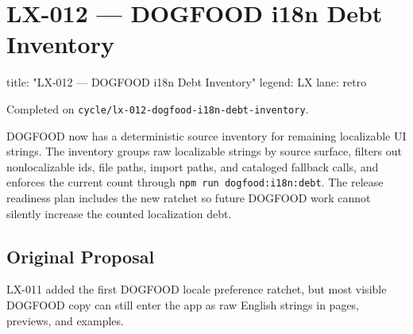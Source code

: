 \chapter{LX-012 --- DOGFOOD i18n Debt Inventory}\label{record-359}

\smallskip

\begin{RecordMeta}
title: "LX-012 — DOGFOOD i18n Debt Inventory"
legend: LX
lane: retro

\end{RecordMeta}

Completed on \texttt{c\allowbreak{}y\allowbreak{}c\allowbreak{}l\allowbreak{}e\allowbreak{}/\allowbreak{}l\allowbreak{}x\allowbreak{}-\allowbreak{}0\allowbreak{}1\allowbreak{}2\allowbreak{}-\allowbreak{}d\allowbreak{}o\allowbreak{}g\allowbreak{}f\allowbreak{}o\allowbreak{}o\allowbreak{}d\allowbreak{}-\allowbreak{}i\allowbreak{}1\allowbreak{}8\allowbreak{}n\allowbreak{}-\allowbreak{}d\allowbreak{}e\allowbreak{}b\allowbreak{}t\allowbreak{}-\allowbreak{}i\allowbreak{}n\allowbreak{}v\allowbreak{}e\allowbreak{}n\allowbreak{}t\allowbreak{}o\allowbreak{}r\allowbreak{}y}.

DOGFOOD now has a deterministic source inventory for remaining localizable UI strings. The inventory groups raw localizable strings by source surface, filters out nonlocalizable ids, file paths, import paths, and cataloged fallback calls, and enforces the current count through \texttt{n\allowbreak{}p\allowbreak{}m\allowbreak{} \allowbreak{}r\allowbreak{}u\allowbreak{}n\allowbreak{} \allowbreak{}d\allowbreak{}o\allowbreak{}g\allowbreak{}f\allowbreak{}o\allowbreak{}o\allowbreak{}d\allowbreak{}:\allowbreak{}i\allowbreak{}1\allowbreak{}8\allowbreak{}n\allowbreak{}:\allowbreak{}d\allowbreak{}e\allowbreak{}b\allowbreak{}t}. The release readiness plan includes the new ratchet so future DOGFOOD work cannot silently increase the counted localization debt.

\section{Original Proposal}\label{record-359-original-proposal}

LX-011 added the first DOGFOOD locale preference ratchet, but most visible DOGFOOD copy can still enter the app as raw English strings in pages, previews, and examples.

